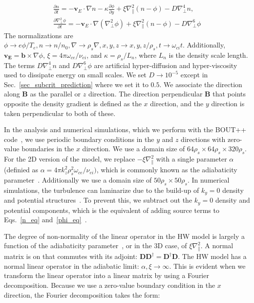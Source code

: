 \documentclass[twocolumn,showkeys,superscriptaddress]{revtex4}
\def\beqar{\begin{eqnarray}}
\def\eeqar{\end{eqnarray}}
\newcommand{\pdiff}[2]{\frac{\partial#1}{\partial#2}}
\def\grad{\nabla}
\newcommand{\gradpar}{\grad_\parallel}
\newcommand{\gradperp}{\grad_\perp}
\begin{document}
\beqar
\label{n_eq}
\pdiff{n}{t} = - {\mathbf v_E} \cdot \grad n - \kappa \pdiff{\phi}{y} + \xi \gradpar^2 (n - \phi) - D \gradperp^4 n, \\
\label{phi_eq}
\pdiff{\gradperp^2 \phi}{t} = - {\mathbf v_E} \cdot \grad (\gradperp^2 \phi) + \xi \gradpar^2 (n - \phi) - D \gradperp^6 \phi
\eeqar
The normalizations are $\phi \to e \phi/T_e, n \to n/n_0, \grad \to \rho_s \grad , x,y,z \to x,y,z/\rho_s, t \to \omega_{ci} t $. Additionally,
$\mathbf{v_E} = \mathbf{b} \times \grad \phi$, $\xi = 4 \pi \omega_{ce}/\nu_{ei}$, 
and $\kappa = \rho_s/L_n$, where $L_n$ is the density scale length. The terms $D \gradperp^4 n$ and $D \gradperp^6 \phi$ are artificial hyper-diffusion and hyper-viscosity used to dissipate
energy on small scales. We set $D \to 10^{-5}$ except in Sec.~\ref{sec_subcrit_prediction} where we set it to $0.5$.
We associate the direction along $\mathbf{B}$ as the parallel or $z$ direction. The direction perpendicular $\mathbf{B}$ that
points opposite the density gradient is defined as the $x$ direction, and the $y$ direction is taken perpendicular to both of these.

In the analysis and numerical simulations, which we perform with the BOUT++ code~\cite{dudson2009}, we use periodic boundary conditions in
the $y$ and $z$ directions with zero-value boundaries in the $x$ direction. We use a domain size of $64 \rho_s \times 64 \rho_s \times 320 \rho_s$.
For the 2D version of the model, we replace $-\xi \gradpar^2$ with a single parameter $\alpha$ (definied as $\alpha = 4 \pi k_z^2 \rho_s^2 \omega_{ce} /\nu_{ei})$, 
which is commonly known as the adiabaticity parameter~\cite{camargo1995,camargo1998}. Additionally we use a domain size of $50 \rho_s \times 50 \rho_s$.
In numerical simulations, the turbulence can laminarize due to the build-up of $k_y=0$ density and potential structures~\cite{biskamp1995}. To prevent this, we subtract out the $k_y=0$
density and potential components, which is the equivalent of adding source terms to Eqs.~\ref{n_eq} and~\ref{phi_eq}~\cite{friedman2012b}.

The degree of non-normality of the linear operator in the HW model is largely a function of the adiabaticity parameter~\cite{camargo1998}, or in the 3D case, of $\xi \gradpar^2$. 
A normal matrix is on that commutes with its adjoint: $\mathbf{D} \mathbf{D}^\dagger = \mathbf{D}^\dagger \mathbf{D}$.
The HW model has a normal linear operator in the adiabatic limit: $\alpha, \xi \to \infty$. 
This is evident when we transform the linear operator into a linear matrix by using a Fourier decomposition. Because we use a zero-value boundary condition in the $x$ direction, the
Fourier decomposition takes the form:
\end{document}
